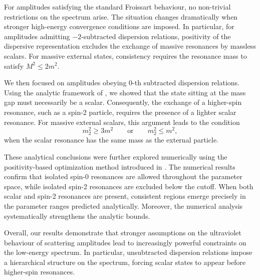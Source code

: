For amplitudes satisfying the standard Froissart behaviour, no non-trivial restrictions on the spectrum arise. The situation changes dramatically when stronger high-energy convergence conditions are imposed. In particular, for amplitudes admitting $-2$-subtracted dispersion relations, positivity of the dispersive representation excludes the exchange of massive resonances by massless scalars. For massive external states, consistency requires the resonance mass to satisfy $M^2 \leq 2m^2$.

We then focused on amplitudes obeying $0$-th subtracted dispersion relations. Using the analytic framework of \cite{Berman:2024kdh}, we showed that the state sitting at the mass gap must necessarily be a scalar. Consequently, the exchange of a higher-spin resonance, such as a spin-2 particle, requires the presence of a lighter scalar resonance. For massive external scalars, this argument leads to the condition
\[
m_2^2 \geq 3m^2
\qquad \text{or} \qquad
m_2^2 \leq m^2,
\]
when the scalar resonance has the same mass as the external particle.

These analytical conclusions were further explored numerically using the positivity-based optimization method introduced in . The numerical results confirm that isolated spin-0 resonances are allowed throughout the parameter space, while isolated spin-2 resonances are excluded below the cutoff. When both scalar and spin-2 resonances are present, consistent regions emerge precisely in the parameter ranges predicted analytically. Moreover, the numerical analysis systematically strengthens the analytic bounds.

Overall, our results demonstrate that stronger assumptions on the ultraviolet behaviour of scattering amplitudes lead to increasingly powerful constraints on the low-energy spectrum. In particular, unsubtracted dispersion relations impose a hierarchical structure on the spectrum, forcing scalar states to appear before higher-spin resonances. 